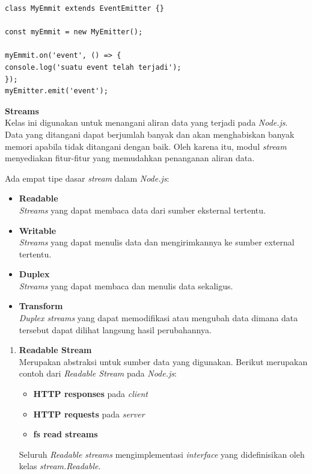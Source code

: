 \documentclass[a4paper,twoside]{article}
\begin{document}
\begin{enumerate}
\begin{enumerate}
\begin{itemize}
\begin{lstlisting}
class MyEmmit extends EventEmitter {}
				
const myEmmit = new MyEmitter();
				
myEmmit.on('event', () => {
console.log('suatu event telah terjadi');	
});
myEmitter.emit('event');
\end{lstlisting} 
			\end{itemize}
			
			\textbf{Streams} \\
			Kelas ini digunakan untuk menangani aliran data yang terjadi pada \textit{Node.js}. Data yang ditangani dapat berjumlah banyak dan akan menghabiskan banyak memori apabila tidak ditangani dengan baik. Oleh karena itu, modul \textit{stream} menyediakan fitur-fitur yang memudahkan penanganan aliran data.
			
			Ada empat tipe dasar \textit{stream} dalam \textit{Node.js}:
			\begin{itemize}
				\item \textbf{Readable} \\ \textit{Streams} yang dapat membaca data dari sumber eksternal tertentu.
				\item \textbf{Writable} \\ \textit{Streams} yang dapat menulis data dan mengirimkannya ke sumber external tertentu.
				\item \textbf{Duplex} \\ \textit{Streams} yang dapat membaca dan menulis data sekaligus.
				\item \textbf{Transform} \\ \textit{Duplex streams} yang dapat memodifikasi atau mengubah data dimana data tersebut dapat dilihat langsung hasil perubahannya.
			\end{itemize}
			
			\begin{enumerate}
				\item \textbf{Readable Stream} \\
				Merupakan abstraksi untuk sumber data yang digunakan. Berikut merupakan contoh dari \textit{Readable Stream} pada \textit{Node.js}:
				\begin{itemize}
					\item \textbf{HTTP responses} pada \textit{client}
					\item \textbf{HTTP requests} pada \textit{server}
					\item \textbf{fs read streams}
				\end{itemize}
				Seluruh \textit{Readable streams} mengimplementasi \textit{interface} yang didefinisikan oleh kelas \textit{stream.Readable}.
				

\end{enumerate}
\end{enumerate}
\end{enumerate}
\end{document}
